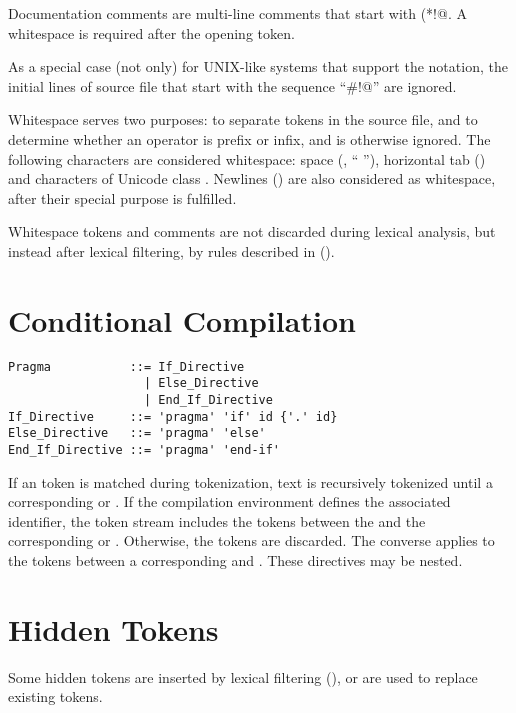 Documentation comments are multi-line comments that start with \lstinline@(*!@. A whitespace is required after the opening token. 

As a special case (not only) for UNIX-like systems that support the notation, the initial lines of source file that start with the sequence ``\lstinline@#!@'' are ignored. 

Whitespace serves two purposes: to separate tokens in the source file, and to determine whether an operator is prefix or infix, and is otherwise ignored. The following characters are considered whitespace: space (, `` ''), horizontal tab () and characters of Unicode class . Newlines () are also considered as whitespace, after their special purpose is fulfilled. 

Whitespace tokens and comments are not discarded during lexical analysis, but instead after lexical filtering, by rules described in ().





\section{Conditional Compilation}
\label{sec:conditional-compilation}

\syntax\begin{lstlisting}
Pragma           ::= If_Directive 
                   | Else_Directive 
                   | End_If_Directive 
If_Directive     ::= 'pragma' 'if' id {'.' id}
Else_Directive   ::= 'pragma' 'else'
End_If_Directive ::= 'pragma' 'end-if'
\end{lstlisting}

If an  token is matched during tokenization, text is recursively tokenized until a corresponding  or . If the compilation environment defines the associated identifier, the token stream includes the tokens between the  and the corresponding  or . Otherwise, the tokens are discarded. The converse applies to the tokens between a corresponding  and . These directives may be nested. 





\section{Hidden Tokens}
\label{sec:hidden-tokens}

Some hidden tokens are inserted by lexical filtering (), or are used to replace existing tokens. 






